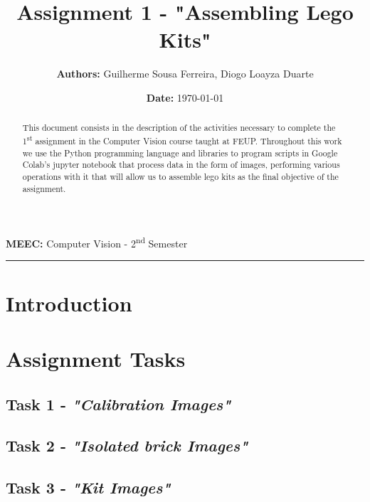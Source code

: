 \documentclass[11pt, a4paper]{article}
\title{
	\huge{\textbf{Assignment 1 - "Assembling Lego Kits"}} 
}
\author{\textbf{Authors:} Guilherme Sousa Ferreira, Diogo Loayza Duarte}
\date{}
\begin{document}
\maketitle
\vspace{-10pt}
\textbf{MEEC: }Computer Vision - 2\textsuperscript{nd} Semester
\hfill
\date{\textbf{Date: }\today}
\rule{\linewidth}{0.5pt}

\begin{abstract}
This document consists in the description of the activities necessary to complete the 1\textsuperscript{st} assignment in the Computer Vision course taught at FEUP. Throughout this work we use the Python programming language and libraries to program scripts in Google Colab's jupyter notebook that process data in the form of images, performing various operations with it that will allow us to assemble lego kits as the final objective of the assignment.
\end{abstract}

\tableofcontents
\listoffigures
\listoftables

\section*{Introduction}

\section*{Assignment Tasks}

\subsection*{Task 1 - \textit{"Calibration Images"}}

\subsection*{Task 2 - \textit{"Isolated brick Images"}}

\subsection*{Task 3 - \textit{"Kit Images"}}
\end{document}
